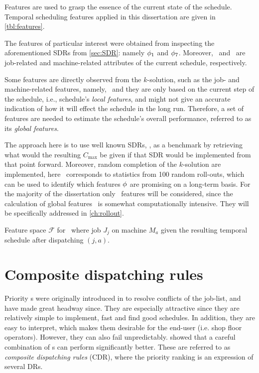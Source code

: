 Features are used to grasp the essence of the current state of the schedule. 
Temporal scheduling features applied in this dissertation are given in 
\cref{tbl:features}. 


The features of particular interest were obtained from inspecting the 
aforementioned SDRs from \cref{sec:SDR}: namely $\phi_1$ and $\phi_7$. 
Moreover, \phiJobRelated\ and \phiMacRelated\ are job-related and 
machine-related attributes of the current schedule, respectively. 

Some features are directly observed from the $k$-solution, such as the job- 
and machine-related features, namely, \phiLocalRelated\ and they are only based 
on the current step of the schedule, 
i.e., schedule's \emph{local features}, and might not give an accurate 
indication of how it will effect the schedule in the long run. Therefore, a set 
of features are needed to estimate the schedule's overall performance, referred 
to as its \emph{global features}. 

The approach here is to use well known SDRs, \phiSDRRelated, as a benchmark by 
retrieving what would the resulting $C_{\max}$ be given if that SDR would 
be implemented from that point forward. 
Moreover, random completion of the $k$-solution are implemented, 
here \phiRNDRelated\ corresponds to statistics from 100 random roll-outs, which 
can be used to identify which features ${\mathbf{\phi}}$ are promising on a long-term 
basis. For the majority of the dissertation only \phiLocalRelated\ features 
will be considered, since the calculation of global features 
\phiGlobalRelated\  is somewhat computationally intensive. 
They will be specifically addressed in \cref{ch:rollout}.

\begin{table} \centering 
    \caption[Feature space $\mathcal{F}$ for \JSP]{Feature space $\mathcal{F}$ 
        for \JSP\ where job $J_j$ on machine $M_a$ given the resulting temporal 
        schedule after dispatching $(j,a)$.}
    \label{tbl:features}
    
\end{table}

\section{Composite dispatching rules}\label{sec:CDR}

Priority \dr s were originally introduced in \citet{Giffler60} to resolve 
conflicts of the job-list, and have made great headway since. 
They are especially attractive since they are relatively simple to 
implement, fast and find good schedules. In addition, they are easy 
to interpret, which makes them desirable for the end-user (i.e. shop floor 
operators). 
However, they can also fail unpredictably. 
\citet{Jayamohan04} showed that a careful combination of \dr s can 
perform significantly better. These are referred to as \emph{composite 
dispatching rules} (CDR), where the priority ranking is an expression of 
several DRs. 

